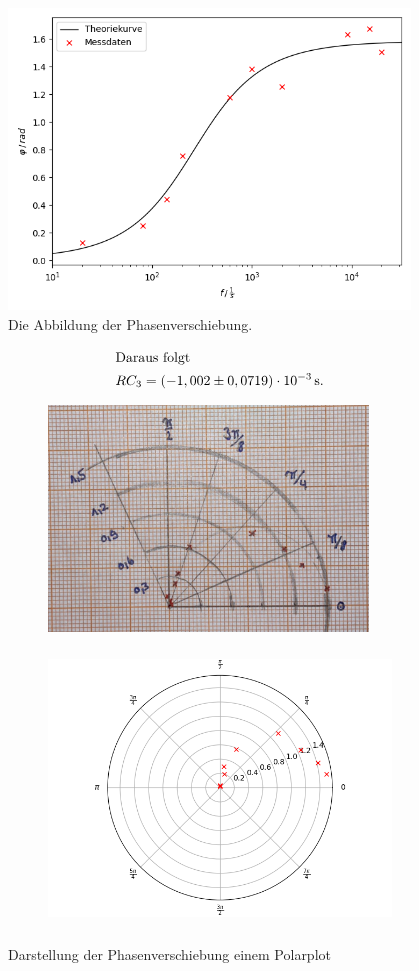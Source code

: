 \begin{figure}[H]    
    \centering
    \includegraphics[height=80mm]{bilder/Phasenverschiebung.png}
    \caption{Die Abbildung der Phasenverschiebung.\label{Abbildung6} }
\end{figure}

\begin{align*}
    \intertext{Daraus folgt}
    RC_{3} = ( -1,002 \pm 0,0719 )\cdot 10^{-3}\,\unit{\second}.
\end{align*}

\begin{figure}[H]
    \begin{subfigure}{0.60\textwidth}
        \centering
        \includegraphics[width=85mm]{bilder/polarbild.jpeg}
        \caption{} 
        \label{}
    \end{subfigure}
    \hfill
    \begin{subfigure}{0.60\textwidth}
        \centering
        \includegraphics[height=73mm]{bilder/Polarplot1.png}
        \caption{} 
        \label{}
    \end{subfigure}
    \caption{Darstellung der Phasenverschiebung einem Polarplot}
    \label{}
\end{figure}

